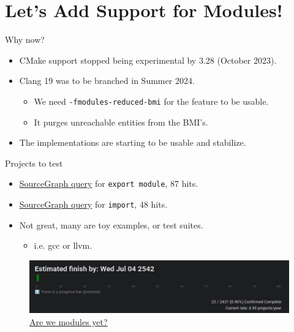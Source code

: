 \documentclass[]{beamer}
\begin{document}

\section*{Let's Add Support for Modules!}

\begin{frame}{Why now?}
  \begin{itemize}
    \item CMake support stopped being experimental by 3.28 (October 2023).
    \item Clang 19 was to be branched in Summer 2024.
          \begin{itemize}
            \item We need \texttt{-fmodules-reduced-bmi} for the feature to be usable.
            \item It purges unreachable entities from the BMI's.
          \end{itemize}
    \item The implementations are starting to be usable and stabilize.
  \end{itemize}
\end{frame}

\begin{frame}{Projects to test}
  \begin{itemize}
    \item \href{https://tinyurl.com/rwd48zpb}{SourceGraph query} for \texttt{export  module}, 87 hits.
    \item \href{https://tinyurl.com/ejey2pnt}{SourceGraph query} for \texttt{import}, 48 hits.
    \item Not great, many are toy examples, or test suites.
          \begin{itemize}
            \item i.e. gcc or llvm.
          \end{itemize}
  \end{itemize}
  \begin{figure}
    \includegraphics[width=\linewidth]{arewemodules.png}
    \caption{\href{https://arewemodulesyet.org/}{Are we modules yet?}}
  \end{figure}
\end{frame}
\end{document}

